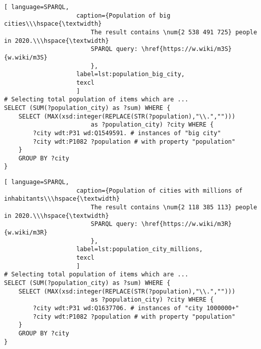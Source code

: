 
\begin{lstlisting}[ language=SPARQL, 
                    caption={Population of big cities\\\hspace{\textwidth}
                        The result contains \num{2 538 491 725} people in 2020.\\\hspace{\textwidth}
                        SPARQL query: \href{https://w.wiki/m3S}{w.wiki/m3S}
                        },
                    label=lst:population_big_city,
                    texcl 
                    ]
# Selecting total population of items which are ...
SELECT (SUM(?population_city) as ?sum) WHERE {                    
	SELECT (MAX(xsd:integer(REPLACE(STR(?population),"\\.",""))) 
						as ?population_city) ?city WHERE {
		?city wdt:P31 wd:Q1549591. # instances of "big city"
		?city wdt:P1082 ?population # with property "population"
	}
	GROUP BY ?city
}
\end{lstlisting}%

\begin{lstlisting}[ language=SPARQL, 
                    caption={Population of cities with millions of inhabitants\\\hspace{\textwidth}
                        The result contains \num{2 118 385 113} people in 2020.\\\hspace{\textwidth}
                        SPARQL query: \href{https://w.wiki/m3R}{w.wiki/m3R}
                        },
                    label=lst:population_city_millions,
                    texcl 
                    ]
# Selecting total population of items which are ...
SELECT (SUM(?population_city) as ?sum) WHERE {
	SELECT (MAX(xsd:integer(REPLACE(STR(?population),"\\.",""))) 
						as ?population_city) ?city WHERE {
		?city wdt:P31 wd:Q1637706. # instances of "city 1000000+"
		?city wdt:P1082 ?population # with property "population"
	}
	GROUP BY ?city
}
\end{lstlisting}%

